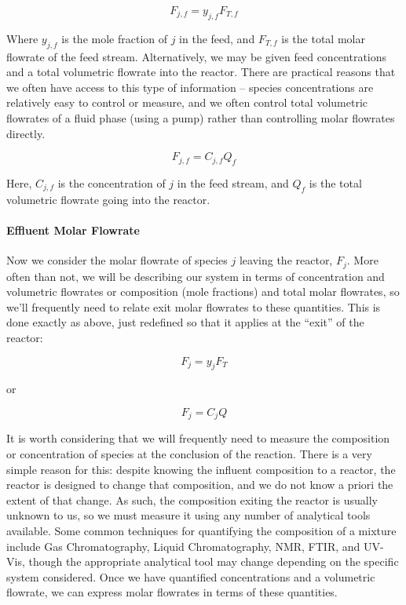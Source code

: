 \documentclass[11pt]{article}
\begin{document}
\[F_{j,f} = y_{j,f}F_{T,f}\]

Where \(y_{j,f}\) is the mole fraction of \(j\) in the feed, and
\(F_{T,f}\) is the total molar flowrate of the feed stream.
Alternatively, we may be given feed concentrations and a total
volumetric flowrate into the reactor. There are practical reasons that
we often have access to this type of information -- species
concentrations are relatively easy to control or measure, and we often
control total volumetric flowrates of a fluid phase (using a pump)
rather than controlling molar flowrates directly.

\[F_{j,f} = C_{j,f}Q_{f}\]

Here, \(C_{j,f}\) is the concentration of \(j\) in the feed stream, and
\(Q_f\) is the total volumetric flowrate going into the reactor.

\hypertarget{effluent-molar-flowrate}{%
\paragraph{Effluent Molar Flowrate}\label{effluent-molar-flowrate}}

Now we consider the molar flowrate of species \(j\) leaving the reactor,
\(F_j\). More often than not, we will be describing our system in terms
of concentration and volumetric flowrates or composition (mole
fractions) and total molar flowrates, so we'll frequently need to relate
exit molar flowrates to these quantities. This is done exactly as above,
just redefined so that it applies at the ``exit'' of the reactor:

\[F_{j} = y_{j}F_T\]

or

\[F_{j} = C_{j}Q\]

It is worth considering that we will frequently need to measure the
composition or concentration of species at the conclusion of the
reaction. There is a very simple reason for this: despite knowing the
influent composition to a reactor, the reactor is designed to change
that composition, and we do not know a priori the extent of that change.
As such, the composition exiting the reactor is usually unknown to us,
so we must measure it using any number of analytical tools available.
Some common techniques for quantifying the composition of a mixture
include Gas Chromatography, Liquid Chromatography, NMR, FTIR, and
UV-Vis, though the appropriate analytical tool may change depending on
the specific system considered. Once we have quantified concentrations
and a volumetric flowrate, we can express molar flowrates in terms of
these quantities.
\end{document}
